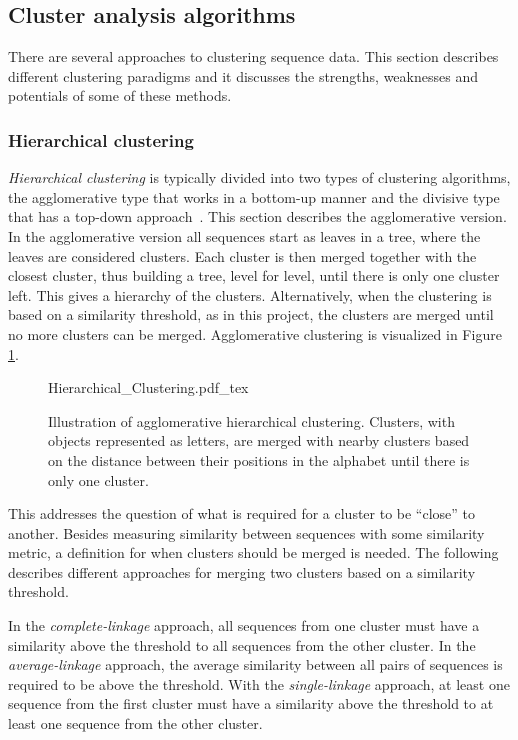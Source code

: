 \subsection{Cluster analysis algorithms}

There are several approaches to clustering sequence data. This section
describes different clustering paradigms and it discusses the strengths,
weaknesses and potentials of some of these methods.

\subsubsection{Hierarchical clustering}

\emph{Hierarchical clustering} is typically divided into two types of
clustering algorithms, the agglomerative type that works in a bottom-up manner
and the divisive type that has a top-down approach~\cite{dong}. This section
describes the agglomerative version. In the agglomerative version all sequences
start as leaves in a tree, where the leaves are considered clusters. Each
cluster is then merged together with the closest cluster, thus building a tree,
level for level, until there is only one cluster left. This gives a hierarchy
of the clusters. Alternatively, when the clustering is based on a similarity
threshold, as in this project, the clusters are merged until no more clusters
can be merged. Agglomerative clustering is visualized in Figure
\ref{fig:hierarchical_clustering}.

\begin{figure}[h!]
  \centering
  \def\svgwidth{\columnwidth}
  {Hierarchical_Clustering.pdf_tex}
  \caption{Illustration of agglomerative hierarchical clustering. Clusters,
  with objects represented as letters, are merged with nearby clusters based
  on the distance between their positions in the alphabet until there is only
  one cluster.}
  \label{fig:hierarchical_clustering}
\end{figure}

This addresses the question of what is required for a cluster to be ``close''
to another. Besides measuring similarity between sequences with some similarity
metric, a definition for when clusters should be merged is needed. The
following describes different approaches for merging two clusters based on a
similarity threshold.

In the \textit{complete-linkage} approach, all sequences from one cluster must
have a similarity above the threshold to all sequences from the other cluster.
In the \textit{average-linkage} approach, the average similarity between all
pairs of sequences is required to be above the threshold. With the
\textit{single-linkage} approach, at least one sequence from the first cluster
must have a similarity above the threshold to at least one sequence from the
other cluster.


